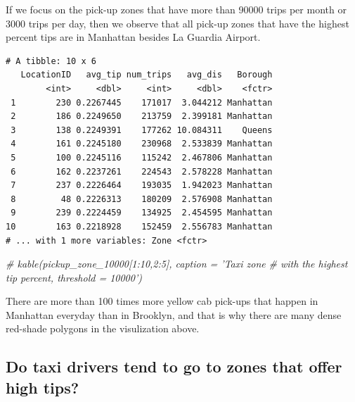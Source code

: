 \documentclass[12pt,twoside]{reedthesis}
\newenvironment{Shaded}{\begin{snugshade}}{\end{snugshade}}
\newcommand{\KeywordTok}[1]{\textcolor[rgb]{0.13,0.29,0.53}{\textbf{#1}}}
\newcommand{\DecValTok}[1]{\textcolor[rgb]{0.00,0.00,0.81}{#1}}
\newcommand{\StringTok}[1]{\textcolor[rgb]{0.31,0.60,0.02}{#1}}
\newcommand{\CommentTok}[1]{\textcolor[rgb]{0.56,0.35,0.01}{\textit{#1}}}
\newcommand{\OperatorTok}[1]{\textcolor[rgb]{0.81,0.36,0.00}{\textbf{#1}}}
\newcommand{\NormalTok}[1]{#1}
\theoremstyle{definition}
\theoremstyle{definition}
\theoremstyle{definition}
\theoremstyle{remark}
\begin{document}
If we focus on the pick-up zones that have more than 90000 trips per
month or 3000 trips per day, then we observe that all pick-up zones that
have the highest percent tips are in Manhattan besides La Guardia
Airport.
\begin{Shaded}
\end{Shaded}
\begin{verbatim}
# A tibble: 10 x 6
   LocationID   avg_tip num_trips   avg_dis   Borough
        <int>     <dbl>     <int>     <dbl>    <fctr>
 1        230 0.2267445    171017  3.044212 Manhattan
 2        186 0.2249650    213759  2.399181 Manhattan
 3        138 0.2249391    177262 10.084311    Queens
 4        161 0.2245180    230968  2.533839 Manhattan
 5        100 0.2245116    115242  2.467806 Manhattan
 6        162 0.2237261    224543  2.578228 Manhattan
 7        237 0.2226464    193035  1.942023 Manhattan
 8         48 0.2226313    180209  2.576908 Manhattan
 9        239 0.2224459    134925  2.454595 Manhattan
10        163 0.2218928    152459  2.556783 Manhattan
# ... with 1 more variables: Zone <fctr>
\end{verbatim}
\begin{Shaded}
\begin{Highlighting}[]
\CommentTok{# kable(pickup_zone_10000[1:10,2:5], caption = 'Taxi zone}
\CommentTok{# with the highest tip percent, threshold = 10000')}
\end{Highlighting}
\end{Shaded}
There are more than 100 times more yellow cab pick-ups that happen in
Manhattan everyday than in Brooklyn, and that is why there are many
dense red-shade polygons in the visulization above.

\subsection{Do taxi drivers tend to go to zones that offer high
tips?}\label{do-taxi-drivers-tend-to-go-to-zones-that-offer-high-tips}
\end{document}
